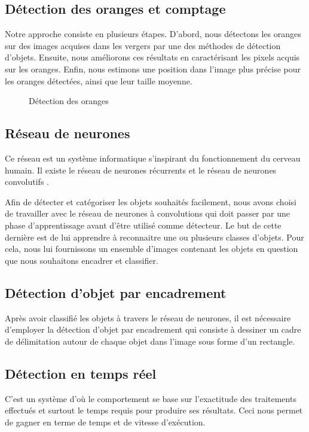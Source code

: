 \subsection{Détection des oranges et comptage}
Notre approche consiste en plusieurs étapes. D'abord, nous détectons les oranges sur des images acquises dans les vergers par une des méthodes de détection d’objets. Ensuite, nous améliorons ces résultats en caractérisant les pixels acquis sur les oranges. Enfin, nous estimons une position  dans l’image plus précise pour les oranges détectées, ainsi que leur taille moyenne.
\begin{figure} [H]
\begin{center}
	\caption{Détection des oranges}
\end{center}
\end{figure}

\subsection{Réseau de neurones}
Ce réseau est un système informatique s'inspirant du fonctionnement du cerveau humain. Il existe le réseau de neurones récurrents et le réseau de neurones convolutifs \cite{Lebigdata}.

Afin de détecter et catégoriser les objets souhaités facilement, nous avons choisi de travailler avec le réseau de neurones à convolutions qui doit passer par une phase d’apprentissage avant d’être utilisé comme détecteur. Le but de cette dernière est de lui apprendre à reconnaitre une ou plusieurs classes d’objets. Pour cela, nous lui fournissons un ensemble d’images contenant les objets en question que nous souhaitons encadrer et classifier.
\subsection{Détection d'objet par encadrement}
Après avoir classifié les objets à travers le réseau de neurones, il est nécessaire d'employer la détection d'objet par encadrement qui consiste à dessiner un cadre de délimitation autour de chaque objet dans l’image sous forme d'un rectangle.
\subsection{Détection en temps réel}
C'est un système d'où le comportement se base sur l'exactitude des traitements effectués et surtout le temps requis pour produire ses résultats. Ceci nous permet de gagner en terme de temps et de vitesse d'exécution.
